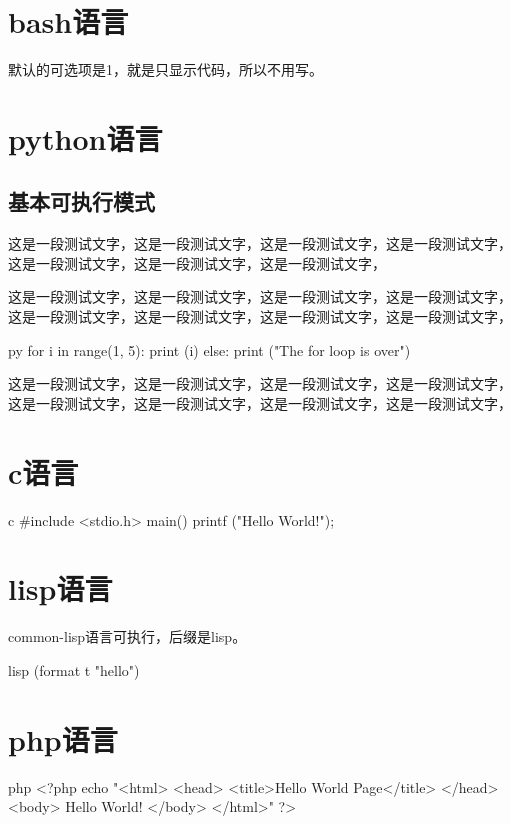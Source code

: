 \documentclass[11pt,oneside]{book}
\begin{document}
\begin{common-format}
\mainmatter


\chapter{bash语言}
默认的可选项是1，就是只显示代码，所以不用写。



\chapter{python语言}
\section{基本可执行模式}
这是一段测试文字，这是一段测试文字，这是一段测试文字，这是一段测试文字，这是一段测试文字，这是一段测试文字，这是一段测试文字，

这是一段测试文字，这是一段测试文字，这是一段测试文字，这是一段测试文字，这是一段测试文字，这是一段测试文字，这是一段测试文字，这是一段测试文字，
\begin{xverbatim}[129]{py}
for i in range(1, 5):
    print (i)
else:
    print ("The for loop is over")
\end{xverbatim}
这是一段测试文字，这是一段测试文字，这是一段测试文字，这是一段测试文字，这是一段测试文字，这是一段测试文字，这是一段测试文字，这是一段测试文字，



\chapter{c语言}
\begin{xverbatim}[1]{c}
#include <stdio.h>
main()
{
printf ("Hello World!\n");
}
\end{xverbatim}

\chapter{lisp语言}
common-lisp语言可执行，后缀是lisp。
\begin{xverbatim}[129]{lisp}
(format t "hello")
\end{xverbatim}


\chapter{php语言}
\begin{xverbatim}{php}
<?php
echo "<html>
<head>
<title>Hello World Page</title>
</head>
<body>
Hello World!
</body>
</html>"
?>
\end{xverbatim}


\end{common-format}
\end{document}
